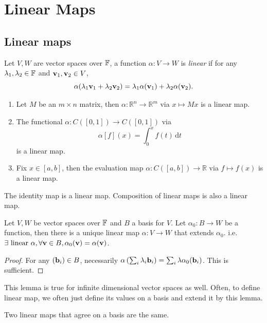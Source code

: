 \documentclass[a4paper]{article}
\begin{document}
\section{Linear Maps}
\subsection{Linear maps}
\begin{definition}
    Let $V,W$ are vector spaces over ${\mathbb{F}}$, a function $\alpha:V\to W$ is \textit{linear} if for any $\lambda_1,\lambda_2\in {\mathbb{F}}$ and ${\bf v}_1,{\bf v}_2\in V$,
    $$\alpha(\lambda_1{\bf v}_1+\lambda_2{\bf v}_2)=\lambda_1\alpha({\bf v}_1)+\lambda_2\alpha({\bf v}_2).$$
\end{definition}
\begin{example}
    \begin{enumerate}
        \item Let $M$ be an $m\times n$ matrix, then $\alpha:\mathbb R^n\to\mathbb R^m$ via $x\mapsto Mx$ is a linear map.
        \item The functional $\alpha:C([0,1])\to C([0,1])$ via
        $$\alpha[f](x)=\int_0^xf(t)\,\mathrm dt$$
        is a linear map.
        \item Fix $x\in[a,b]$, then the evaluation map $\alpha:C([a,b])\to\mathbb R$ via $f\mapsto f(x)$ is a linear map.
    \end{enumerate}
\end{example}
\begin{remark}
    The identity map is a linear map.
    Composition of linear maps is also a linear map.
\end{remark}
\begin{lemma}
    Let $V,W$ be vector spaces over ${\mathbb{F}}$ and $B$ a basis for $V$.
    Let $\alpha_0:B\to W$ be a function, then there is a unique linear map $\alpha:V\to W$ that extends $\alpha_0$. i.e. $\exists \text{ linear }\alpha, \forall{\bf v}\in B, \alpha_0({\bf v})=\alpha({\bf v}) $.
\end{lemma}
\begin{proof}
    For any $({\bf b}_i)\in B$, necessarily $\alpha\left(\sum_i\lambda_i{\bf b}_i\right)=\sum_i\lambda\alpha_0({\bf b}_i)$.
    This is sufficient.
\end{proof}
\begin{remark}
    This lemma is true for infinite dimensional vector spaces as well.
    Often, to define linear map, we often just define its values on a basis and extend it by this lemma.
\end{remark}
\begin{corollary}
    Two linear maps that agree on a basis are the same.
\end{corollary}
\end{document}
